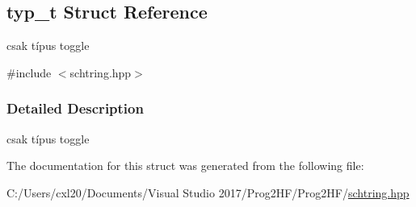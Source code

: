 \hypertarget{structtyp__t}{}\subsection{typ\+\_\+t Struct Reference}
\label{structtyp__t}


csak típus toggle  




{\ttfamily \#include $<$schtring.\+hpp$>$}



\subsubsection{Detailed Description}
csak típus toggle 

The documentation for this struct was generated from the following file\+:\begin{DoxyCompactItemize}
\item 
C\+:/\+Users/cxl20/\+Documents/\+Visual Studio 2017/\+Prog2\+H\+F/\+Prog2\+H\+F/\mbox{\hyperlink{schtring_8hpp}{schtring.\+hpp}}\end{DoxyCompactItemize}
